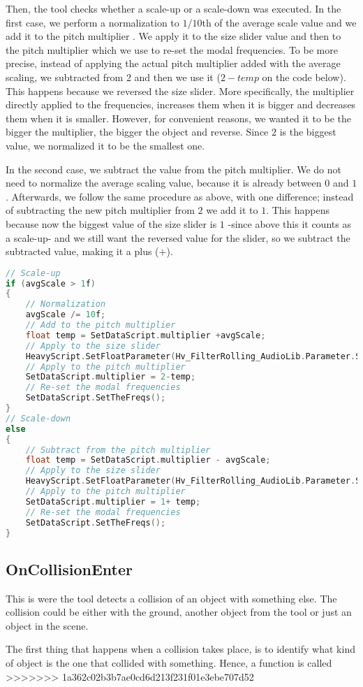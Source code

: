 Then, the tool checks whether a scale-up or a scale-down was executed. In the first case, we perform a normalization to $1/10$th of the average scale value and we add it to the pitch multiplier . We apply it to the size slider value and then to the pitch multiplier which we use to re-set the modal frequencies. To be more precise, instead of applying the actual pitch multiplier added with the average scaling, we subtracted from 2 and then we use it ($2-temp$ on the code below). This happens because we reversed the size slider. More specifically, the multiplier directly applied to the frequencies, increases them when it is bigger and decreases them when it is smaller. However, for convenient reasons, we wanted it to be the bigger the multiplier, the bigger the object and reverse. Since $2$ is the biggest value, we normalized it to be the smallest one.

In the second case, we subtract the value from the pitch multiplier. We do not need to normalize the average scaling value, because it is already between $0$ and $1$. Afterwards, we follow the same procedure as above, with one difference; instead of subtracting the new pitch multiplier from $2$ we add it to $1$. This happens because now the biggest value of the size slider is $1$ -since above this it counts as a scale-up- and we still want the reversed value for the slider, so we subtract the subtracted value, making it a plus ($+$).



\begin{lstlisting}[language=C]
// Scale-up
if (avgScale > 1f)
{
	// Normalization
    avgScale /= 10f;
    // Add to the pitch multiplier
    float temp = SetDataScript.multiplier +avgScale;
    // Apply to the size slider
    HeavyScript.SetFloatParameter(Hv_FilterRolling_AudioLib.Parameter.Size, 2-temp);
    // Apply to the pitch multiplier
    SetDataScript.multiplier = 2-temp;
    // Re-set the modal frequencies
    SetDataScript.SetTheFreqs();
}
// Scale-down
else
{
	// Subtract from the pitch multiplier
    float temp = SetDataScript.multiplier - avgScale;
    // Apply to the size slider
    HeavyScript.SetFloatParameter(Hv_FilterRolling_AudioLib.Parameter.Size, 1 + temp);
    // Apply to the pitch multiplier
    SetDataScript.multiplier = 1+ temp;
    // Re-set the modal frequencies
    SetDataScript.SetTheFreqs();
}
\end{lstlisting}



\subsection{OnCollisionEnter}
This is were the tool detects a collision of an object with something else. The collision could be either with the ground, another object from the tool or just an object in the scene.

The first thing that happens when a collision takes place, is to identify what kind of object is the one that collided with something. Hence, a function is called
>>>>>>> 1a362c02b3b7ae0cd6d213f231f01e3ebe707d52



